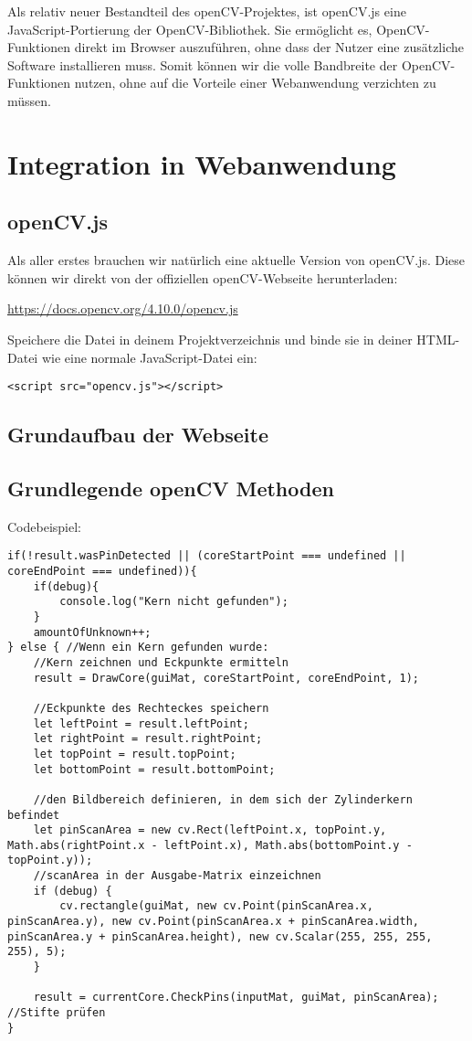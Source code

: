 \documentclass{article}
\begin{document}
Als relativ neuer Bestandteil des openCV-Projektes, ist openCV.js eine JavaScript-Portierung der OpenCV-Bibliothek. Sie ermöglicht es, OpenCV-Funktionen direkt im Browser auszuführen, ohne dass der Nutzer eine zusätzliche Software installieren muss. Somit können wir die volle Bandbreite der OpenCV-Funktionen nutzen, ohne auf die Vorteile einer Webanwendung verzichten zu müssen.

\section{Integration in Webanwendung}
\subsection{openCV.js}
Als aller erstes brauchen wir natürlich eine aktuelle Version von openCV.js. Diese können wir direkt von der offiziellen openCV-Webseite herunterladen:

\href{https://docs.opencv.org/4.10.0/opencv.js}{https://docs.opencv.org/4.10.0/opencv.js}

Speichere die Datei in deinem Projektverzeichnis und binde sie in deiner HTML-Datei wie eine normale JavaScript-Datei ein:

\begin{lstlisting}[style=HTML]
<script src="opencv.js"></script>
\end{lstlisting}


\subsection{Grundaufbau der Webseite}
\subsection{Grundlegende openCV Methoden}
Codebeispiel:

\begin{lstlisting}[style=JavaScript]
if(!result.wasPinDetected || (coreStartPoint === undefined || coreEndPoint === undefined)){
    if(debug){
        console.log("Kern nicht gefunden");
    }
    amountOfUnknown++;
} else { //Wenn ein Kern gefunden wurde:
    //Kern zeichnen und Eckpunkte ermitteln
    result = DrawCore(guiMat, coreStartPoint, coreEndPoint, 1);

    //Eckpunkte des Rechteckes speichern
    let leftPoint = result.leftPoint;
    let rightPoint = result.rightPoint;
    let topPoint = result.topPoint;
    let bottomPoint = result.bottomPoint;

    //den Bildbereich definieren, in dem sich der Zylinderkern befindet
    let pinScanArea = new cv.Rect(leftPoint.x, topPoint.y, Math.abs(rightPoint.x - leftPoint.x), Math.abs(bottomPoint.y - topPoint.y));
    //scanArea in der Ausgabe-Matrix einzeichnen
    if (debug) {
        cv.rectangle(guiMat, new cv.Point(pinScanArea.x, pinScanArea.y), new cv.Point(pinScanArea.x + pinScanArea.width, pinScanArea.y + pinScanArea.height), new cv.Scalar(255, 255, 255, 255), 5);
    }

    result = currentCore.CheckPins(inputMat, guiMat, pinScanArea); //Stifte prüfen
}
\end{lstlisting}
\end{document}

